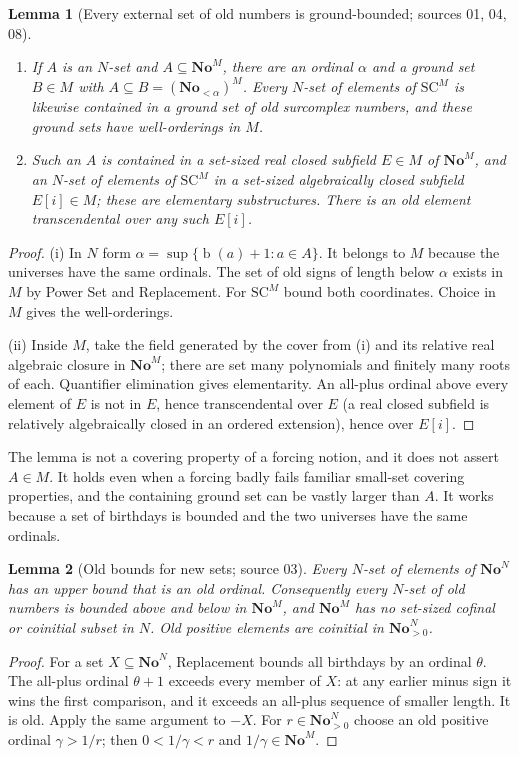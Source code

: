 \documentclass[11pt,letterpaper]{article}
\numberwithin{equation}{section}
\newtheorem{lemma}[lemma]{Lemma}
\theoremstyle{definition}
\theoremstyle{remark}
\newcommand{\No}{\mathbf{No}}
\newcommand{\SC}{\mathrm{SC}}
\newcommand{\NoM}{\No^{M}}
\newcommand{\NoN}{\No^{N}}
\newcommand{\SCM}{\SC^{M}}
\newcommand{\bd}{\operatorname{b}}
\begin{document}
\begin{lemma}[Every external set of old numbers is ground-bounded; sources 01, 04, 08]\label{univ:lem:groundbound}
\begin{enumerate}[label=\textnormal{(\roman*)}]
\item If $A$ is an $N$-set and $A\subseteq\NoM$, there are an ordinal
$\alpha$ and a ground set $B\in M$ with $A\subseteq B=(\No_{<\alpha})^M$.
Every $N$-set of elements of $\SCM$ is likewise contained in a ground set of
old surcomplex numbers, and these ground sets have well-orderings in $M$.
\item Such an $A$ is contained in a set-sized real closed subfield $E\in M$ of
$\NoM$, and an $N$-set of elements of $\SCM$ in a set-sized algebraically
closed subfield $E[i]\in M$; these are elementary substructures. There is an
old element transcendental over any such $E[i]$.
\end{enumerate}
\end{lemma}
\begin{proof}
(i) In $N$ form $\alpha=\sup\{\bd(a)+1:a\in A\}$. It belongs to $M$ because
the universes have the same ordinals. The set of old signs of length below
$\alpha$ exists in $M$ by Power Set and Replacement. For $\SCM$ bound both
coordinates. Choice in $M$ gives the well-orderings.

(ii) Inside $M$, take the field generated by the cover from (i) and its
relative real algebraic closure in $\NoM$; there are set many polynomials and
finitely many roots of each. Quantifier elimination gives elementarity. An
all-plus ordinal above every element of $E$ is not in $E$, hence
transcendental over $E$ (a real closed subfield is relatively algebraically
closed in an ordered extension), hence over $E[i]$.
\end{proof}

The lemma is not a covering property of a forcing notion, and it does not
assert $A\in M$. It holds even when a forcing badly fails familiar small-set
covering properties, and the containing ground set can be vastly larger than
$A$. It works because a set of birthdays is bounded and the two universes
have the same ordinals.

\begin{lemma}[Old bounds for new sets; source 03]\label{univ:lem:oldbounds}
Every $N$-set of elements of $\NoN$ has an upper bound that is an old ordinal.
Consequently every $N$-set of old numbers is bounded above and below in
$\NoM$, and $\NoM$ has no set-sized cofinal or coinitial subset in $N$. Old
positive elements are coinitial in $\NoN_{>0}$.
\end{lemma}
\begin{proof}
For a set $X\subseteq\NoN$, Replacement bounds all birthdays by an ordinal
$\theta$. The all-plus ordinal $\theta+1$ exceeds every member of $X$: at any
earlier minus sign it wins the first comparison, and it exceeds an all-plus
sequence of smaller length. It is old. Apply the same argument to $-X$. For
$r\in\NoN_{>0}$ choose an old positive ordinal $\gamma>1/r$; then
$0<1/\gamma<r$ and $1/\gamma\in\NoM$.
\end{proof}
\end{document}
